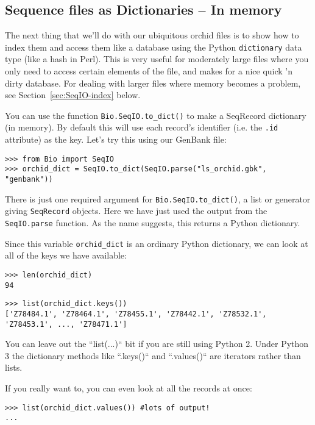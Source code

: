\subsection{Sequence files as Dictionaries -- In memory}
\label{sec:seqio_todict}

The next thing that we'll do with our ubiquitous orchid files is to show how
to index them and access them like a database using the Python \verb|dictionary|
data type (like a hash in Perl). This is very useful for moderately large files
where you only need to access certain elements of the file, and makes for a nice
quick 'n dirty database. For dealing with larger files where memory becomes a
problem, see Section~\ref{sec:SeqIO-index} below.

You can use the function \verb|Bio.SeqIO.to_dict()| to make a SeqRecord dictionary
(in memory).  By default this will use each record's identifier (i.e. the \verb|.id|
attribute) as the key.  Let's try this using our GenBank file:

\begin{verbatim}
>>> from Bio import SeqIO
>>> orchid_dict = SeqIO.to_dict(SeqIO.parse("ls_orchid.gbk", "genbank"))
\end{verbatim}

There is just one required argument for \verb|Bio.SeqIO.to_dict()|, a list or
generator giving \verb|SeqRecord| objects. Here we have just used the output
from the \verb|SeqIO.parse| function. As the name suggests, this returns a
Python dictionary.

Since this variable \verb|orchid_dict| is an ordinary Python dictionary,
we can look at all of the keys we have available:

\begin{verbatim}
>>> len(orchid_dict)
94
\end{verbatim}
\begin{verbatim}
>>> list(orchid_dict.keys())
['Z78484.1', 'Z78464.1', 'Z78455.1', 'Z78442.1', 'Z78532.1', 'Z78453.1', ..., 'Z78471.1']
\end{verbatim}

You can leave out the ``list(...)`` bit if you are still using Python 2.
Under Python 3 the dictionary methods like ``.keys()`` and ``.values()``
are iterators rather than lists.

If you really want to, you can even look at all the records at once:
\begin{verbatim}
>>> list(orchid_dict.values()) #lots of output!
...
\end{verbatim}

